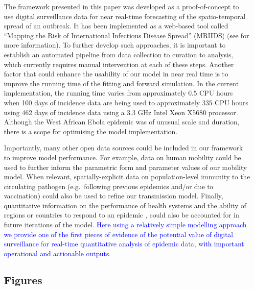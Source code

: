 \documentclass[9pt,twocolumn,twoside,lineno]{pnas-new}
\newcommand{\sangeeta}[1]{\textcolor{blue}{#1}}
\begin{document}
The framework presented in this paper was developed as a
proof-of-concept to use digital surveillance data for near real-time
forecasting of the spatio-temporal spread of an outbreak. It has been
implemented as a web-based tool called ``Mapping the Risk of
International Infectious Disease Spread'' (MRIIDS) (see
\cite{mriidswiki} for more information). To further develop such
approaches, it is important to establish an automated pipeline from data
collection to curation to analysis, which currently requires manual
intervention at each of these steps. Another factor that could enhance
the usability of our model in near real time is to improve the running
time of the fitting and forward simulation. In the current
implementation, the running time varies from approximately 0.5 CPU hours when
100 days of incidence data are being used to approximately 335 CPU hours
using 462 days of incidence data using a 3.3 GHz Intel Xeon X5680
processor. Although the West African Ebola epidemic was of unusual scale
and duration, there is a scope for optimising the model implementation.

Importantly, many other open data sources could be included in our
framework to improve model performance. For example, data on human
mobility could be used to further inform the parametric form and
parameter values of our mobility model. When relevant,
spatially-explicit data on population-level immunity to the circulating
pathogen (e.g.~following previous epidemics and/or due to vaccination)
could also be used to refine our transmission model. Finally,
quantitative information on the performance of health systems and the
ability of regions or countries to respond to an epidemic
\cite{healthsites}, \cite{maina2019spatial} could also be accounted for
in future iterations of the model. \sangeeta{Here using a relatively simple
modelling approach we provide one of the first pieces of evidence of the potential
value of digital surveillance for real-time quantitative analysis of
epidemic data, with important operational and actionable outputs.}


\subsection*{Figures}\label{figures}
\end{document}
